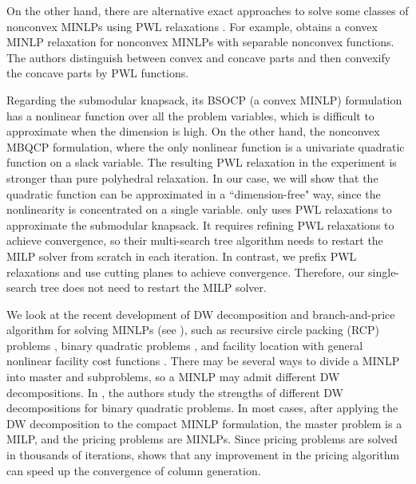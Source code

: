 On the other hand, there are alternative exact approaches to solve some classes of nonconvex MINLPs using PWL relaxations  \citep{d2012algorithmic, geissler2012using}. For example, \cite{d2012algorithmic} obtains a convex MINLP relaxation for nonconvex MINLPs with separable nonconvex functions. The authors distinguish between convex and concave parts and then convexify the concave parts by PWL functions.


Regarding the submodular knapsack, its BSOCP (a convex MINLP) formulation has a nonlinear function over all the problem variables, which is difficult to approximate when  the dimension is high. On the other hand,  the nonconvex MBQCP formulation, where the only nonlinear function is a univariate quadratic function on a slack variable. The resulting PWL relaxation in the experiment is stronger than pure polyhedral relaxation. In our case, we will show that the quadratic function can be approximated in a ``dimension-free" way, since the nonlinearity is concentrated on a single variable. \cite{shylo2013} only uses  PWL relaxations to approximate the submodular knapsack. It requires refining PWL relaxations to achieve convergence, so their multi-search tree algorithm needs to restart the MILP solver from scratch in each iteration. In contrast, we prefix PWL relaxations and use cutting planes to achieve convergence. Therefore, our  single-search tree does not need to restart the MILP solver.



 We look at the recent development of DW decomposition and  branch-and-price algorithm for solving MINLPs
 (see \cite{allman2021branch}), such as recursive circle packing (RCP) problems  \citep{gleixner2020price}, binary quadratic problems \citep{ceselli2022dantzig}, and facility location with general nonlinear facility cost functions \citep{ni2021branch}.  There may be several ways to divide a MINLP into master and subproblems, so a MINLP may admit different DW decompositions. In \cite{ceselli2022dantzig}, the authors study the strengths of different DW decompositions for binary quadratic problems. In most cases, after applying the DW decomposition to the compact MINLP formulation, the master problem is a MILP, and the pricing problems are MINLPs.  Since pricing problems are solved in thousands of iterations, \cite{gleixner2020price} shows that any improvement in the pricing algorithm can speed up the convergence of column generation.






